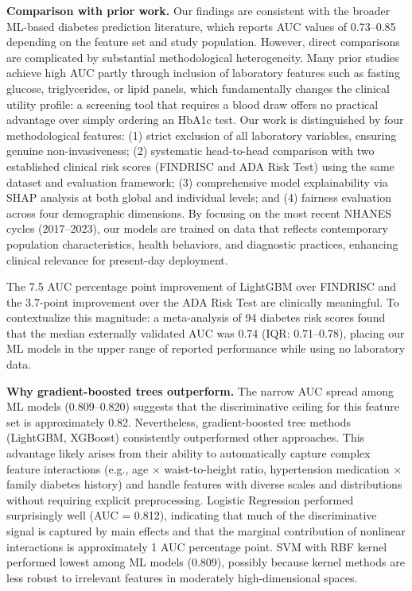 \documentclass{amia}
\begin{document}
\textbf{Comparison with prior work.} Our findings are consistent with the broader ML-based diabetes prediction literature, which reports AUC values of 0.73--0.85 depending on the feature set and study population.\cite{zou2018,kopitar2020,deberneh2021,zhang2020,chan2023} However, direct comparisons are complicated by substantial methodological heterogeneity. Many prior studies achieve high AUC partly through inclusion of laboratory features such as fasting glucose, triglycerides, or lipid panels,\cite{agliata2024,lee2021nhanes} which fundamentally changes the clinical utility profile: a screening tool that requires a blood draw offers no practical advantage over simply ordering an HbA1c test. Our work is distinguished by four methodological features: (1) strict exclusion of all laboratory variables, ensuring genuine non-invasiveness; (2) systematic head-to-head comparison with two established clinical risk scores (FINDRISC and ADA Risk Test) using the same dataset and evaluation framework; (3) comprehensive model explainability via SHAP analysis at both global and individual levels; and (4) fairness evaluation across four demographic dimensions. By focusing on the most recent NHANES cycles (2017--2023), our models are trained on data that reflects contemporary population characteristics, health behaviors, and diagnostic practices, enhancing clinical relevance for present-day deployment.

The 7.5 AUC percentage point improvement of LightGBM over FINDRISC and the 3.7-point improvement over the ADA Risk Test are clinically meaningful. To contextualize this magnitude: a meta-analysis of 94 diabetes risk scores found that the median externally validated AUC was 0.74 (IQR: 0.71--0.78),\cite{kengne2014} placing our ML models in the upper range of reported performance while using no laboratory data.

\textbf{Why gradient-boosted trees outperform.} The narrow AUC spread among ML models (0.809--0.820) suggests that the discriminative ceiling for this feature set is approximately 0.82. Nevertheless, gradient-boosted tree methods (LightGBM, XGBoost) consistently outperformed other approaches. This advantage likely arises from their ability to automatically capture complex feature interactions (e.g., age $\times$ waist-to-height ratio, hypertension medication $\times$ family diabetes history) and handle features with diverse scales and distributions without requiring explicit preprocessing. Logistic Regression performed surprisingly well (AUC = 0.812), indicating that much of the discriminative signal is captured by main effects and that the marginal contribution of nonlinear interactions is approximately 1 AUC percentage point. SVM with RBF kernel performed lowest among ML models (0.809), possibly because kernel methods are less robust to irrelevant features in moderately high-dimensional spaces.
\end{document}
